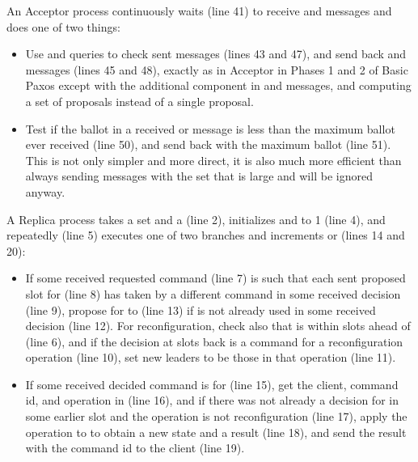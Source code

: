 \documentclass[11pt]{article}
\begin{document}
An Acceptor process continuously waits (line 41) to receive  and
 messages and does one of two things:
\begin{itemize}

\item Use  and  queries to check sent  messages
  (lines 43 and 47), and send back  and  messages (lines 45
  and 48), exactly as in Acceptor in Phases 1 and 2 of Basic Paxos except
  with the additional  component in  and  messages, and
  computing a set  of proposals instead of a single
   proposal.

\item Test if the ballot in a received  or  message is less
  than the maximum ballot ever received (line 50), and send back
   with the maximum ballot (line 51).
  This is not only simpler and more direct, it is also much more efficient
  than always sending  messages with the set  that is
  large and will be ignored anyway.
\end{itemize}

A Replica process takes a set  and a  (line 2),
initializes  and 
to 1 (line 4), and repeatedly (line 5) executes one of two branches and
increments  or  (lines 14 and 20):
\begin{itemize}

\item If some received requested command  (line 7) %
  is such %
  that each sent proposed slot  for  (line 8) has  taken
  by a different command  in some received decision (line 9),
  propose  for  to  (line 13) if
   is not already used in some received decision (line 12).
  For reconfiguration, check also that  is within 
  slots ahead of  (line 6), and if the decision at
   slots back is a command for a reconfiguration operation (line
  10), set new leaders to be those in that operation (line 11).

\item If some received decided command  is for  (line
  15), get the client, command id, and operation in  (line 16), and
  if there was not already a decision for  in some earlier slot
   and the operation is not reconfiguration (line 17), apply the
  operation to  to obtain a new state and a result (line 18), and
  send the result with the command id to the client (line 19).

\end{itemize}
\end{document}
